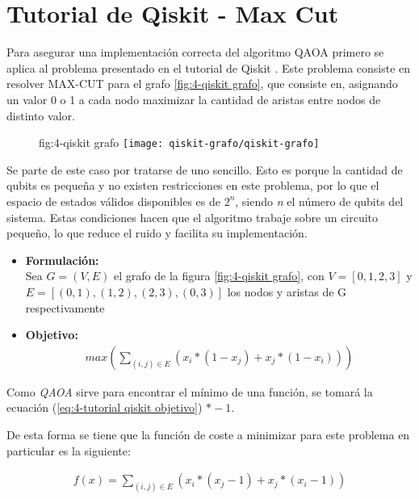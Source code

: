 \section{Tutorial de Qiskit - Max Cut}
\label{sec:4-tutorial de qiskit}

Para asegurar una implementación correcta del algoritmo QAOA primero se aplica al problema presentado en el tutorial de Qiskit \cite{qiskit_tutorial_antiguo}.
Este problema consiste en resolver MAX-CUT para el grafo \ref{fig:4-qiskit grafo}, que consiste en, asignando un valor 0 o 1 a cada nodo maximizar la cantidad de aristas entre nodos de distinto valor.

\begin{figure}[htbp]{fig:4-qiskit grafo}{}
  \centering
  \texttt{[image: qiskit-grafo/qiskit-grafo]}
\end{figure}

Se parte de este caso por tratarse de uno sencillo. Esto es porque la cantidad de qubits es pequeña y no existen restricciones en este problema, por lo que el espacio de estados válidos disponibles es de $2^n$, siendo \textit{n} el número de qubits del sistema. Estas condiciones hacen que el algoritmo trabaje sobre un circuito pequeño, lo que reduce el ruido y facilita su implementación.

\begin{itemize}
\item \textbf{Formulación:} \\
  Sea $G = (V, E)$ el grafo de la figura \ref{fig:4-qiskit grafo}, con $V = [0, 1, 2, 3]$ y $E = [(0, 1), (1, 2), (2, 3), (0, 3)]$ los nodos y aristas de G respectivamente

\item \textbf{Objetivo:} \\
  \begin{align} \label{eq:4-tutorial qiskit objetivo}
    max(\sum_{(i, j) \in E} (x_i * (1 - x_j) + x_j * (1 - x_i)))
  \end{align}

\end{itemize}

Como \textit{QAOA} sirve para encontrar el mínimo de una función, se tomará la ecuación (\ref{eq:4-tutorial qiskit objetivo}) $*-1$.

De esta forma se tiene que la función de coste a minimizar para este problema en particular es la siguiente:

\begin{align*}
  f(x) = \sum_{(i, j) \in E} (x_i * (x_j - 1) + x_j * (x_i - 1))
\end{align*}

